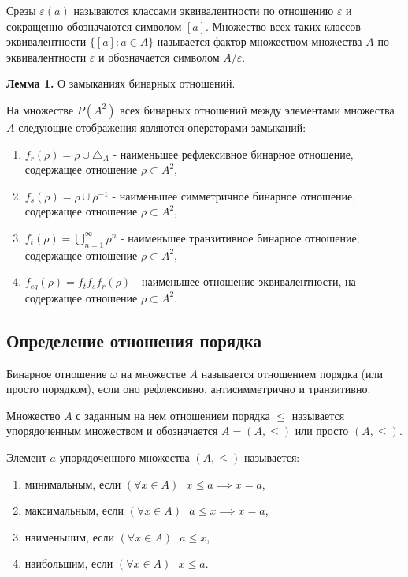 \documentclass[bachelor, och, labwork]{shiza}
\begin{document}
        Срезы $\varepsilon(a)$ называются классами эквивалентности по отношению $\varepsilon$ и сокращенно обозначаются символом $[a]$. Множество всех таких классов эквивалентности $\{[a]: a \in A\}$ называется фактор-множеством множества $A$ по эквивалентности $\varepsilon$ и обозначается символом $A/\varepsilon$.

        \textbf{Лемма 1.} О замыканиях бинарных отношений.

        На множестве $P(A^2)$ всех бинарных отношений между элементами множества $A$ следующие отображения являются
        операторами замыканий:

        \begin{enumerate}
            \item $f_r(\rho) = \rho \cup \triangle_A$ - наименьшее рефлексивное бинарное отношение, содержащее отношение
            $\rho \subset A^2$,
            \item $f_s(\rho) = \rho \cup \rho^{-1}$ - наименьшее симметричное бинарное отношение, содержащее отношение
            $\rho \subset A^2$,
            \item $f_t(\rho) = \bigcup^\infty_{n=1} \rho^{n}$ - наименьшее транзитивное бинарное отношение, содержащее
            отношение $\rho \subset A^2$,
            \item $f_{eq}(\rho) = f_t f_s f_r(\rho)$ - наименьшее отношение эквивалентности, на содержащее отношение
            $\rho \subset A^2$.
        \end{enumerate}        

    \subsection{Определение отношения порядка}

        Бинарное отношение $\omega$ на множестве $A$ называется отношением порядка (или просто порядком), если оно
        рефлексивно, антисимметрично и транзитивно.

        Множество $A$ с заданным на нем отношением порядка $\leq$ называется упорядоченным множеством и обозначается $A
        = (A, \leq)$ или просто $(A, \leq)$.

        Элемент $a$ упорядоченного множества $(A, \leq)$ называется:
        \begin{enumerate}
            \item минимальным, если $(\forall x \in A) \text{ } x \leq a \implies x = a$,
            \item максимальным, если $(\forall x \in A) \text{ } a \leq x \implies x = a$,
            \item наименьшим, если $(\forall x \in A) \text{ } a \leq x$,
            \item наибольшим, если $(\forall x \in A) \text{ } x \leq a$.
        \end{enumerate}
\end{document}

